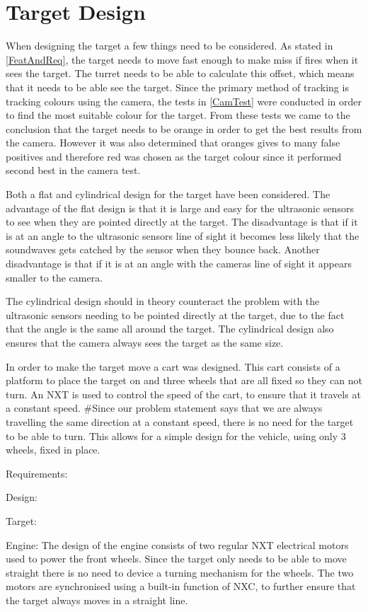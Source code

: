 \section{Target Design}
When designing the target a few things need to be considered. As stated in
\autoref{FeatAndReq}, the target needs to move fast enough to make \name
miss if \name fires when it sees the target. The turret needs to be able to calculate this offset,
which means that it needs to be able see the target. Since the primary method of
tracking is tracking colours using the camera, the tests in \autoref{CamTest}
were conducted in order to find the most suitable colour for the target. From these
tests we came to the conclusion that the target needs to be orange in order to get the best
results from the camera. However it was also determined that oranges gives to many false positives and
therefore red was chosen as the target colour since it performed second best in
the camera test.\nl

Both a flat and cylindrical design for the target have been considered. The
advantage of the flat design is that it is large and easy for the ultrasonic
sensors to see when they are pointed directly at the target. The disadvantage
is that if it is at an angle to the ultrasonic sensors line of sight it
becomes less likely that the soundwaves gets catched by the sensor when they
bounce back. Another disadvantage is that if it is at an angle with the
cameras line of sight it appears smaller to the camera.\nl

The cylindrical design should in theory counteract the problem with the
ultrasonic sensors needing to be pointed directly at the target, due to the
fact that the angle is the same all around the target. The cylindrical design
also ensures that the camera always sees the target as the same size.\nl

In order to make the target move a cart was designed. This cart consists of a
platform to place the target on and three wheels that are all fixed so they can
not turn. An NXT is used to control the speed of the cart, to ensure that it
travels at a constant speed.
#Since our problem statement says that we are always travelling the same direction
at a constant speed, there is no need for the target to be able to turn. This allows
for a simple design for the vehicle, using only 3 wheels, fixed in place.

Requirements:

Design:

  Target:

  Engine:
  The design of the engine consists of two regular NXT electrical motors used to
  power the front wheels. Since the target only needs to be able to move straight
  there is no need to device a turning mechanism for the wheels. The two motors
  are synchronised using a built-in function of NXC, to further ensure that the
  target always moves in a straight line.

